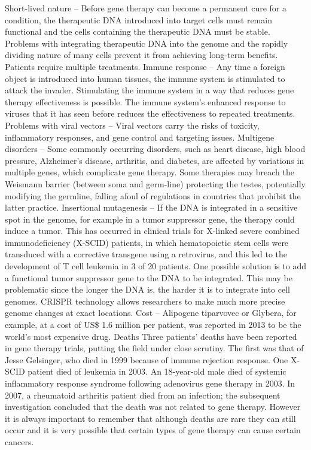 Short-lived nature -- Before gene therapy can become a permanent cure for a condition, the therapeutic DNA introduced into target cells must remain functional and the cells containing the therapeutic DNA must be stable. Problems with integrating therapeutic DNA into the genome and the rapidly dividing nature of many cells prevent it from achieving long-term benefits. Patients require multiple treatments.
Immune response -- Any time a foreign object is introduced into human tissues, the immune system is stimulated to attack the invader. Stimulating the immune system in a way that reduces gene therapy effectiveness is possible. The immune system's enhanced response to viruses that it has seen before reduces the effectiveness to repeated treatments.
Problems with viral vectors -- Viral vectors carry the risks of toxicity, inflammatory responses, and gene control and targeting issues.
Multigene disorders -- Some commonly occurring disorders, such as heart disease, high blood pressure, Alzheimer's disease, arthritis, and diabetes, are affected by variations in multiple genes, which complicate gene therapy.
Some therapies may breach the Weismann barrier (between soma and germ-line) protecting the testes, potentially modifying the germline, falling afoul of regulations in countries that prohibit the latter practice.
Insertional mutagenesis -- If the DNA is integrated in a sensitive spot in the genome, for example in a tumor suppressor gene, the therapy could induce a tumor. This has occurred in clinical trials for X-linked severe combined immunodeficiency (X-SCID) patients, in which hematopoietic stem cells were transduced with a corrective transgene using a retrovirus, and this led to the development of T cell leukemia in 3 of 20 patients. One possible solution is to add a functional tumor suppressor gene to the DNA to be integrated. This may be problematic since the longer the DNA is, the harder it is to integrate into cell genomes. CRISPR technology allows researchers to make much more precise genome changes at exact locations.
Cost -- Alipogene tiparvovec or Glybera, for example, at a cost of US\$ 1.6 million per patient, was reported in 2013 to be the world's most expensive drug.
Deaths
Three patients' deaths have been reported in gene therapy trials, putting the field under close scrutiny. The first was that of Jesse Gelsinger, who died in 1999 because of immune rejection response. One X-SCID patient died of leukemia in 2003. An 18-year-old male died of systemic inflammatory response syndrome following adenovirus gene therapy in 2003. In 2007, a rheumatoid arthritis patient died from an infection; the subsequent investigation concluded that the death was not related to gene therapy. However it is always important to remember that although deaths are rare they can still occur and it is very possible that certain types of gene therapy can cause certain cancers.

